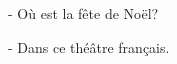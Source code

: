 \documentclass{article}
\begin{document}
- Où est la fête de Noël? 

- Dans ce théâtre français.
\end{document}
